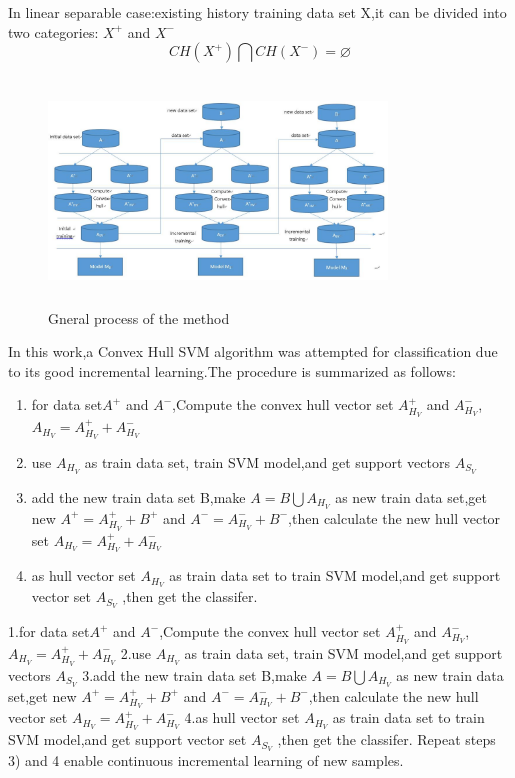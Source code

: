 \documentclass[a4paper]{article}
\begin{document}
 In linear separable case:existing history training data set X,it can be divided into two categories: $X^{+}$ and $X^{-}$
$$
CH(X^{+}) \bigcap CH(X^{-}) = \varnothing
$$
\begin{figure}[h]
  \centering
  \includegraphics[width=9cm,height=6cm]{算法示意图}
  \caption{Gneral process of the method}
\end{figure}
In this work,a Convex Hull SVM algorithm was attempted for classification due to its good incremental learning.The procedure is summarized as follows:\\
\begin{enumerate}
\item for data set$A^{+}$ and $A^{-}$,Compute the convex hull vector set $A ^{+}_{H_{V}}$ and $A^{-}_{H_{V}}$, $A_{H_{V}} = A ^{+}_{H_{V}} + A ^{-}_{H_{V}} $
\item use $A_{H_{V}}$ as train data set, train SVM model,and get support vectors $A_{S_{V}}$ \\
\item add the new train data set B,make $A = B \bigcup A_{H_{V}}$ as new train data set,get new $A^{+} = A^{+} _{H_{V}} + B^{+}$ and $A^{-} =  A^{-} _{H_{V}} + B^{-}$,then calculate the new hull vector set  $A_{H_{V}} = A ^{+}_{H_{V}} + A ^{-}_{H_{V}} $\\
\item as hull vector set $A_{H_{V}}$ as train data set to train SVM model,and get support vector set $A_{S_{V}}$ ,then get the classifer.
\end{enumerate}

1.for data set$A^{+}$ and $A^{-}$,Compute the convex hull vector set $A ^{+}_{H_{V}}$ and $A^{-}_{H_{V}}$, $A_{H_{V}} = A ^{+}_{H_{V}} + A ^{-}_{H_{V}} $
2.use $A_{H_{V}}$ as train data set, train SVM model,and get support vectors $A_{S_{V}}$
3.add the new train data set B,make $A = B \bigcup A_{H_{V}}$ as new train data set,get new $A^{+} = A^{+} _{H_{V}} + B^{+}$ and $A^{-} =  A^{-} _{H_{V}} + B^{-}$,then calculate the new hull vector set  $A_{H_{V}} = A ^{+}_{H_{V}} + A ^{-}_{H_{V}} $
4.as hull vector set $A_{H_{V}}$ as train data set to train SVM model,and get support vector set $A_{S_{V}}$ ,then get the classifer.
Repeat steps 3) and 4 enable continuous incremental learning of new samples.
\end{document}
